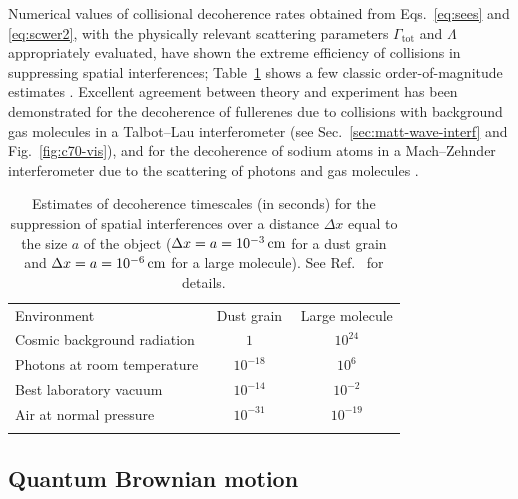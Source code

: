 \documentclass[aps,pra,reprint,amsmath,amssymb,showpacs,nofootinbib,floatfix,onecolumn,12pt]{revtex4-1}
\begin{document}
Numerical values of collisional decoherence rates obtained from Eqs.~\eqref{eq:sees} and \eqref{eq:scwer2}, with the physically relevant scattering parameters $\Gamma_\text{tot}$ and $\Lambda$ appropriately evaluated, have shown the extreme efficiency of collisions in suppressing spatial interferences; Table~\ref{tab:decrate} shows a few classic order-of-magnitude estimates \cite{Joos:1985:iu,Joos:2003:jh,Schlosshauer:2007:un}. Excellent agreement between theory and experiment has been demonstrated for the decoherence of fullerenes due to collisions with background gas molecules in a Talbot--Lau interferometer \cite{Hackermuller:2003:uu,Hornberger:2003:tv,Hornberger:2003:un,Hornberger:2004:bb,Nimmrichter:2011:pr} (see Sec.~\ref{sec:matt-wave-interf} and Fig.~\ref{fig:c70-vis}), and for the decoherence of sodium atoms in a Mach--Zehnder interferometer due to the scattering of photons \cite{Kokorowski:2001:ub} and gas molecules \cite{Uys:2005:yb}.

\begin{table}[t]
\centering
\caption{Estimates of decoherence timescales (in seconds) for the
  suppression of spatial interferences over a distance $\Delta x$
  equal to the size $a$ of the object ($\Delta x = a = \unit[10^{-3}]{cm}$ for
  a dust grain and $\Delta x = a = \unit[10^{-6}]{cm}$ for a large
  molecule). See Ref.~\cite{Schlosshauer:2007:un} for details.}
\label{tab:decrate}
\begin{tabular}{lcc}
  \hline\noalign{\smallskip}
  Environment & \,\,Dust grain\,\, &  Large molecule \\
  \noalign{\smallskip}\hline\noalign{\smallskip}
  Cosmic background radiation  & $1$  & $10^{24}$ \\
  Photons at room temperature  & $10^{-18}$  & $10^{6}$ \\
  Best laboratory vacuum  & $10^{-14}$ & $10^{-2}$\\
  Air at normal pressure  & $10^{-31}$ & $10^{-19}$\\
  \noalign{\smallskip}\hline
\end{tabular}
\end{table}


\subsection{\label{sec:quant-brown-moti}Quantum Brownian motion}
\end{document}
